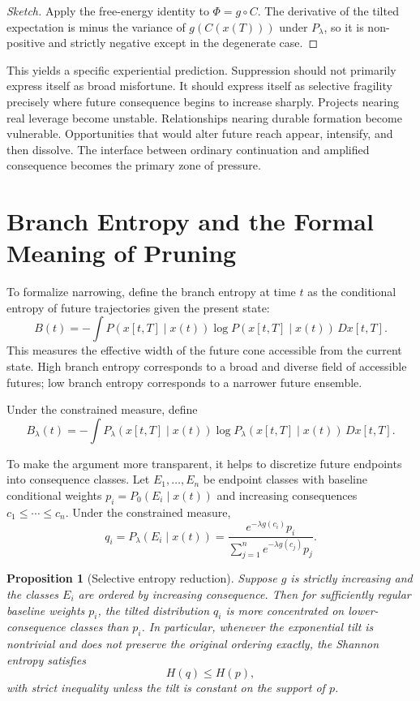 \documentclass[12pt]{article}
\newtheorem{proposition}{Proposition}
\begin{document}
\begin{proof}[Sketch]
Apply the free-energy identity to $\Phi = g \circ C$. The derivative of the tilted expectation is minus the variance of $g(C(x(T)))$ under $P_\lambda$, so it is non-positive and strictly negative except in the degenerate case.
\end{proof}

This yields a specific experiential prediction. Suppression should not primarily express itself as broad misfortune. It should express itself as selective fragility precisely where future consequence begins to increase sharply. Projects nearing real leverage become unstable. Relationships nearing durable formation become vulnerable. Opportunities that would alter future reach appear, intensify, and then dissolve. The interface between ordinary continuation and amplified consequence becomes the primary zone of pressure.

\section{Branch Entropy and the Formal Meaning of Pruning}

To formalize narrowing, define the branch entropy at time $t$ as the conditional entropy of future trajectories given the present state:
\[
B(t) = -\int P(x[t,T] \mid x(t)) \log P(x[t,T] \mid x(t))\, Dx[t,T].
\]
This measures the effective width of the future cone accessible from the current state. High branch entropy corresponds to a broad and diverse field of accessible futures; low branch entropy corresponds to a narrower future ensemble.

Under the constrained measure, define
\[
B_\lambda(t) = -\int P_\lambda(x[t,T] \mid x(t)) \log P_\lambda(x[t,T] \mid x(t))\, Dx[t,T].
\]

To make the argument more transparent, it helps to discretize future endpoints into consequence classes. Let $E_1,\dots,E_n$ be endpoint classes with baseline conditional weights $p_i = P_0(E_i \mid x(t))$ and increasing consequences $c_1 \le \cdots \le c_n$. Under the constrained measure,
\[
q_i = P_\lambda(E_i \mid x(t)) = \frac{e^{-\lambda g(c_i)} p_i}{\sum_{j=1}^n e^{-\lambda g(c_j)} p_j}.
\]

\begin{proposition}[Selective entropy reduction]
Suppose $g$ is strictly increasing and the classes $E_i$ are ordered by increasing consequence. Then for sufficiently regular baseline weights $p_i$, the tilted distribution $q_i$ is more concentrated on lower-consequence classes than $p_i$. In particular, whenever the exponential tilt is nontrivial and does not preserve the original ordering exactly, the Shannon entropy satisfies
\[
H(q) \le H(p),
\]
with strict inequality unless the tilt is constant on the support of $p$.
\end{proposition}
\end{document}
